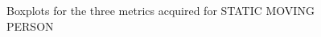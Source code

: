 \begin{figure}[t!]
\centering
{}%
\hspace{0.1cm}
%

\caption{Boxplots for the three metrics acquired for STATIC MOVING PERSON}
\label{fig:boxplots_singlePersonMov}
\end{figure}


